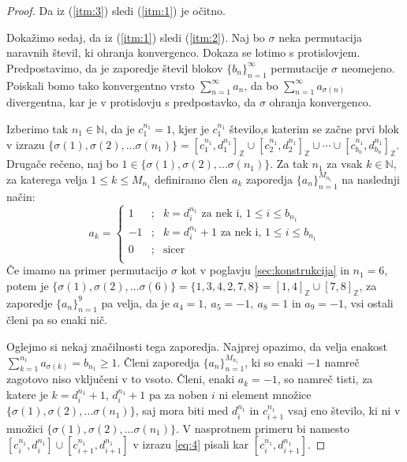 \documentclass[12pt,a4paper,reqno]{amsart}
\theoremstyle{definition} %
\theoremstyle{plain} %
\newcommand{\N}{\mathbb N}
\newcommand{\Z}{\mathbb Z}
\begin{document}
\begin{proof}
Da iz (\ref{itm:3}) sledi (\ref{itm:1}) je očitno.

Dokažimo sedaj, da iz (\ref{itm:1}) sledi (\ref{itm:2}).
Naj bo $\sigma$ neka permutacija naravnih števil, ki ohranja konvergenco. Dokaza se lotimo s protislovjem. Predpostavimo, da je zaporedje števil blokov $\{b_n\}^{\infty}_{n=1}$ permutacije $\sigma$ neomejeno. Poiskali bomo tako konvergentno vrsto $\sum^{\infty}_{n=1}a_n$, da bo $\sum^{\infty}_{n=1}a_{\sigma (n)}$ divergentna, kar je v protislovju s predpostavko, da $\sigma$ ohranja konvergenco. 

Izberimo tak $n_1\in \N$, da je $c_1^{n_1}=1$, kjer je  $c_1^{n_1}$ število,s katerim se začne prvi blok v izrazu $\{ \sigma (1), \sigma (2), \ldots \sigma (n_1) \} = [c^{n_1}_1, d^{n_1}_1]_{\Z} \cup [c^{n_1}_2, d^{n_1}_2]_{\Z} \cup \cdots \cup [c^{n_1}_{b_n}, d^{n_1}_{b_n}]_{\Z}$. Drugače rečeno, naj bo $1\in \{ \sigma (1), \sigma (2), \ldots \sigma (n_1) \}$. Za tak $n_1$ za vsak $k\in \N$, za katerega velja $1 \leq k \leq M_{n_1}$ definiramo člen $a_k$ zaporedja $\{a_n\}^{M_{n_1}}_{n=1}$ na naslednji način:
$$a_k = 
\left\{ 
\begin{array}{ccc}
1&;&k=d_i^{n_1}\textrm{ za nek i, }1\leq i \leq b_{n_1}\\
-1&;&k=d_i^{n_1}+1\textrm{ za nek i, }1\leq i \leq b_{n_1}\\
0&;&\textrm{sicer}\\
\end{array}
\right. 
$$
Če imamo na primer permutacijo $\sigma$ kot v poglavju \ref{sec:konstrukcija} in $n_1=6$, potem je $\{ \sigma (1), \sigma (2), \ldots \sigma (6) \} = \{1, 3, 4, 2, 7, 8 \}= [1,4]_{\Z} \cup [7,8]_{\Z}$, za zaporedje $\{a_n\}^{9}_{n=1}$ pa velja, da je $a_4=1,\ a_5=-1,\ a_8 =1$ in $a_9=-1$, vsi ostali členi pa so enaki nič.

Oglejmo si nekaj značilnosti tega zaporedja. Najprej opazimo, da velja enakost $\sum_{k=1}^{n_1}a_{\sigma(k)}=b_{n_1}\geq 1$. Členi zaporedja $\{a_n\}^{M_{n_1}}_{n=1}$, ki so enaki $-1$ namreč zagotovo niso vključeni v to vsoto. Členi, enaki $a_k=-1$, so namreč tisti, za katere je $k=d_i^{n_1}+1$, $d_i^{n_1}+1$ pa za noben $i$ ni element množice $\{ \sigma (1), \sigma (2), \ldots \sigma (n_1) \}$, saj mora biti med $d_i^{n_1}$ in $c_{i+1}^{n_1}$ vsaj eno število, ki ni v množici $\{ \sigma (1), \sigma (2), \ldots \sigma (n_1) \}$. V nasprotnem primeru bi namesto $[c_i^{n_1},d_i^{n_1}] \cup [c_{i+1}^{n_1},d_{i+1}^{n_1}]$ v izrazu \ref{eq:4} pisali kar $[c_i^{n_1},d_{i+1}^{n_1}]$. 


\end{proof}
\end{document}
